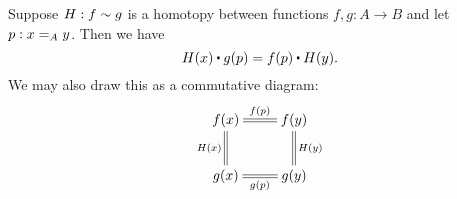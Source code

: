 \documentclass[hott-all.tex]{subfiles}
\begin{document}

%

\begin{lem}\label{lem:htpy-natural}
  Suppose $H:f\htpy g$ is a homotopy between functions $f,g:A\to B$ and let $p:\id[A]xy$.  Then we have
  \begin{equation*}
    H(x)\ct\ap{g}{p}=\ap{f}{p}\ct H(y).
  \end{equation*}
  We may also draw this as a commutative diagram:
  \begin{align*}
    \xymatrix{
      f(x) \ar@{=}[r]^{\ap fp} \ar@{=}[d]_{H(x)} & f(y) \ar@{=}[d]^{H(y)} \\
      g(x) \ar@{=}[r]_{\ap gp} & g(y)
    }
  \end{align*}
\end{lem}
\end{document}
